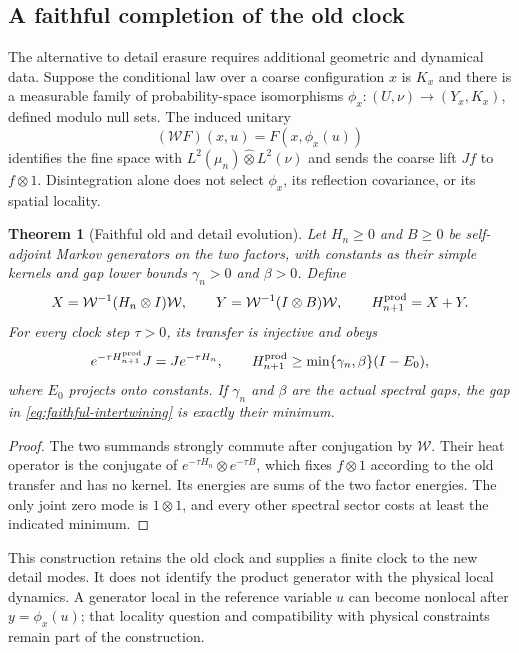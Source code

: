 \documentclass[11pt,a4paper,oneside]{book}
\theoremstyle{plain}
\newtheorem{theorem}{Theorem}[chapter]
\theoremstyle{definition}
\theoremstyle{remark}
\newcommand{\src}[2]{\cite{#1}}
\begin{document}
\subsection{A faithful completion of the old clock}
The alternative to detail erasure requires additional geometric and
dynamical data.  Suppose the conditional law over a coarse configuration
$x$ is $K_x$ and there is a measurable family of probability-space
isomorphisms $\phi_x:(U,\nu)\to(Y_x,K_x)$, defined modulo null sets.  The
induced unitary
\[
 (\mathcal WF)(x,u)=F(x,\phi_x(u))
\]
identifies the fine space with $L^2(\mu_n)\widehat\otimes L^2(\nu)$ and
sends the coarse lift $Jf$ to $f\otimes1$.  Disintegration alone does not
select $\phi_x$, its reflection covariance, or its spatial locality.

\begin{theorem}[Faithful old and detail evolution]
\label{thm:faithful-clock}
Let $H_n\ge0$ and $B\ge0$ be self-adjoint Markov generators on the two
factors, with constants as their simple kernels and gap lower bounds
$\gamma_n>0$ and $\beta>0$.  Define
\begin{equation}
 X=\mathcal W^{-1}(H_n\otimes I)\mathcal W,
 \qquad Y=\mathcal W^{-1}(I\otimes B)\mathcal W,
 \qquad H_{n+1}^{\rm prod}=X+Y.
 \label{eq:faithful-product-clock}
\end{equation}
For every clock step $\tau>0$, its transfer is injective and obeys
\begin{equation}
 e^{-\tau H_{n+1}^{\rm prod}}J=Je^{-\tau H_n},
 \qquad
 H_{n+1}^{\rm prod}\ge\min\{\gamma_n,\beta\}(I-E_0),
 \label{eq:faithful-intertwining}
\end{equation}
where $E_0$ projects onto constants.  If $\gamma_n$ and $\beta$ are the
actual spectral gaps, the gap in \eqref{eq:faithful-intertwining} is
exactly their minimum.
\end{theorem}
\begin{proof}
The two summands strongly commute after conjugation by $\mathcal W$.
Their heat operator is the conjugate of
$e^{-\tau H_n}\otimes e^{-\tau B}$, which fixes $f\otimes1$ according to
the old transfer and has no kernel.  Its energies are sums of the two
factor energies.  The only joint zero mode is $1\otimes1$, and every
other spectral sector costs at least the indicated minimum.
\end{proof}
\src{R14}{thm:v14v97-faithful-lift,cor:v14v97-commuting}

This construction retains the old clock and supplies a finite clock to
the new detail modes.  It does not identify the product generator with the
physical local dynamics.  A generator local in the reference variable
$u$ can become nonlocal after $y=\phi_x(u)$; that locality question and
compatibility with physical constraints remain part of the construction.
\end{document}
